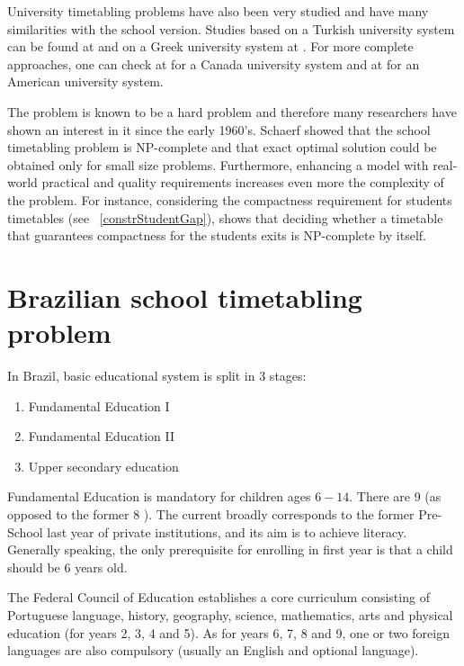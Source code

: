 University timetabling problems have also been very studied and have many similarities with the school version. Studies based on a Turkish university system can be found at \cite{Guenalay2006} and on a Greek university system at \cite{Daskalaki2005}. For more complete approaches, one can check at \cite{Carter2001} for a Canada university system and at \cite{Murray2007} for an American university system.

The problem is known to be a hard problem and therefore many researchers have shown an interest in it since the early 1960's. Schaerf \cite{Schaerf99} showed that the school timetabling problem is NP-complete and that exact optimal solution could be obtained only for small size problems. Furthermore, enhancing a model with real-world practical and quality requirements increases even more the complexity of the problem. For instance, considering the compactness requirement for students timetables (see ~\ref{constrStudentGap}), \cite{Asratian2002} shows that deciding whether a timetable that guarantees compactness for the students exits is NP-complete by itself.



\section{Brazilian school timetabling problem}

In Brazil, basic educational system is split in 3 stages:
\begin{enumerate}
\item Fundamental Education I
\item Fundamental Education II
\item Upper secondary education
\end{enumerate}

Fundamental Education is mandatory for children ages $6-14$. There are 9  (as opposed to the former 8 ). The current  broadly corresponds to the former Pre-School last year of private institutions, and its aim is to achieve literacy. Generally speaking, the only prerequisite for enrolling in first year is that a child should be 6 years old.

The Federal Council of Education establishes a core curriculum consisting of Portuguese language, history, geography, science, mathematics, arts and physical education (for years 2, 3, 4 and 5). As for years 6, 7, 8 and 9, one or two foreign languages are also compulsory (usually an English and optional language).

